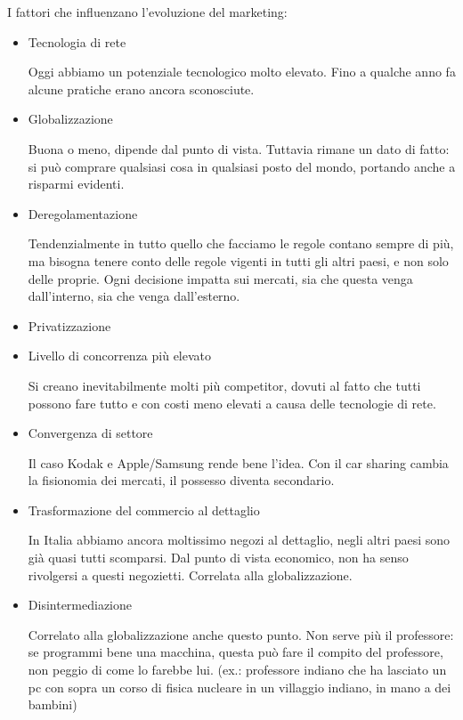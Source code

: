 \documentclass[11pt]{article}
\begin{document}
\bigskip
\noindent I fattori che influenzano l'evoluzione del marketing:
\begin{itemize}[noitemsep, topsep=0ex]
	\item Tecnologia di rete

		\quad Oggi abbiamo un potenziale tecnologico molto elevato. Fino a qualche anno fa alcune pratiche erano ancora sconosciute.
	
	\item Globalizzazione
	
		\quad Buona o meno, dipende dal punto di vista. Tuttavia rimane un dato di fatto: si può comprare qualsiasi cosa in qualsiasi posto del mondo, portando anche a risparmi evidenti.
			
	\item Deregolamentazione
	
		\quad Tendenzialmente in tutto quello che facciamo le regole contano sempre di più, ma bisogna tenere conto delle regole vigenti in tutti gli altri paesi, e non solo delle proprie.
Ogni decisione impatta sui mercati, sia che questa venga dall’interno, sia che venga dall’esterno.
	
	\item Privatizzazione
	\item Livello di concorrenza più elevato
	
		\quad Si creano inevitabilmente molti più competitor, dovuti al fatto che tutti possono fare tutto e con costi meno elevati a causa delle tecnologie di rete.
	
	\item Convergenza di settore
	
		\quad Il caso Kodak e Apple/Samsung rende bene l’idea.
Con il car sharing cambia la fisionomia dei mercati, il possesso diventa secondario.
	
	\item Trasformazione del commercio al dettaglio
	
		\quad In Italia abbiamo ancora moltissimo negozi al dettaglio, negli altri paesi sono già quasi tutti scomparsi.
Dal punto di vista economico, non ha senso rivolgersi a questi negozietti.
Correlata alla globalizzazione.
	
	\item Disintermediazione
	
		\quad Correlato alla globalizzazione anche questo punto.
Non serve più il professore: se programmi bene una macchina, questa può fare il compito del professore, non peggio di come lo farebbe lui. (ex.: professore indiano che ha lasciato un pc con sopra un corso di fisica nucleare in un villaggio indiano, in mano a dei bambini)
	

\end{itemize}
\end{document}
